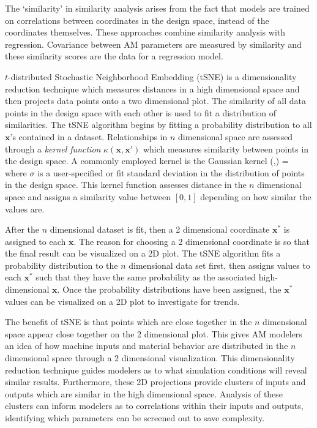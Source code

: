 The `similarity' in similarity analysis arises from the fact that models are trained on correlations between coordinates in the design space, instead of the coordinates themselves. These approaches combine similarity analysis with regression. Covariance between AM parameters are measured by similarity and these similarity scores are the data for a regression model. 

$t$-distributed Stochastic Neighborhood Embedding (tSNE) is a dimensionality reduction technique which measures distances in a high dimensional space and then projects data points onto a two dimensional plot. The similarity of all data points in the design space with each other is used to fit a distribution of similarities. The tSNE algorithm begins by fitting a probability distribution to all $\mathbf{x}$'s contained in a dataset. Relationships in $n$ dimensional space are assessed through a \textit{kernel function} $\kappa(\mathbf{x},\mathbf{x'})$ which measures similarity between points in the design space. A commonly employed kernel is the Gaussian kernel
\eqn
	\kappa(,) = 
	\label{gausskernel}
\equ 
where $\sigma$ is a user-specified or fit standard deviation in the distribution of points in the design space. This kernel function assesses distance in the $n$ dimensional space and assigns a similarity value between $\left[0, 1\right]$ depending on how similar the values are. 

 After the $n$ dimensional dataset is fit, then a 2 dimensional coordinate $\mathbf{x}^*$ is assigned to each $\mathbf{x}$. The reason for choosing a 2 dimensional coordinate is so that the final result can be visualized on a 2D plot. The tSNE algorithm fits a probability distribution to the $n$ dimensional data set first, then assigns values to each $\mathbf{x}^*$ such that they have the same probability as the associated high-dimensional $\mathbf{x}$. Once the probability distributions have been assigned, the $\mathbf{x}^*$ values can be visualized on a 2D plot to investigate for trends.

The benefit of tSNE is that points which are close together in the $n$ dimensional space appear close together on the 2 dimensional plot. This gives AM modelers an idea of how machine inputs and material behavior are distributed in the $n$ dimensional space through a 2 dimensional visualization. This dimensionality reduction technique guides modelers as to what simulation conditions will reveal similar results. Furthermore, these 2D projections provide clusters of inputs and outputs which are similar in the high dimensional space. Analysis of these clusters can inform modelers as to correlations within their inputs and outputs, identifying which parameters can be screened out to save complexity.


